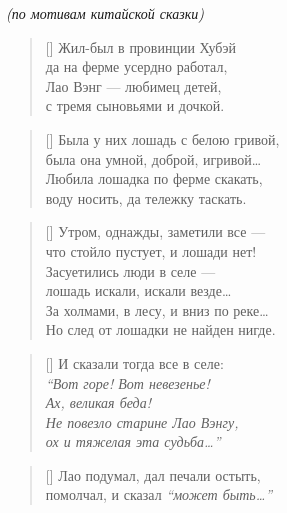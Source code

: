 \documentclass[14pt]{memoir}
\begin{document}
\PlainPoemTitle
{}
\vspace{-7mm}
\begin{center}\small{\textit{(по мотивам китайской сказки)}}\end{center}

\begin{verse}[\versewidth]
Жил-был в провинции Хубэй \\
да на ферме усердно работал, \\
Лао Вэнг ---  любимец детей, \\
с тремя сыновьями и дочкой. \\
\end{verse}

\begin{verse}[\versewidth]
Была у них лошадь с белою гривой, \\
была она умной, доброй, игривой\ldots \\
Любила лошадка по ферме скакать, \\
воду носить, да тележку таскать. \\
\end{verse}

\begin{verse}[\versewidth]
Утром, однажды, заметили все ---  \\
что стойло пустует, и лошади нет! \\
Засуетились люди в селе ---  \\
лошадь искали, искали везде\ldots \\
За холмами, в лесу, и вниз по реке\ldots \\
Но след от лошадки не найден нигде. \\
\end{verse}

\begin{verse}[\versewidth]
И сказали тогда все в селе: \\
\emph{``Вот горе! Вот невезенье! \\
Ах, великая беда! \\
Не повезло старине Лао Вэнгу, \\
ох и тяжелая эта судьба\ldots''} \\
\end{verse}

\begin{verse}[\versewidth]
Лао подумал, дал печали остыть, \\
помолчал, и сказал \emph{``может быть\ldots''} \\
\end{verse}
\end{document}
